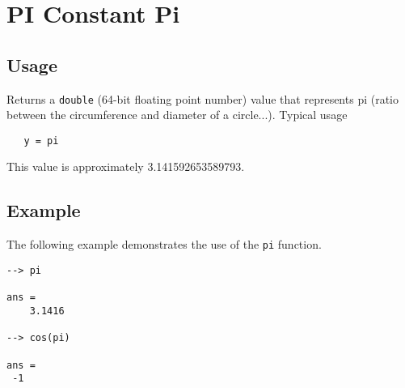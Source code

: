\section{PI Constant Pi}

\subsection{Usage}

Returns a \verb|double| (64-bit floating point number) value that represents pi (ratio between the circumference and diameter of a circle...).  Typical usage 
\begin{verbatim}
   y = pi
\end{verbatim}
This value is approximately 3.141592653589793.
\subsection{Example}

The following example demonstrates the use of the \verb|pi| function.
\begin{verbatim}
--> pi

ans = 
    3.1416 

--> cos(pi)

ans = 
 -1 
\end{verbatim}
